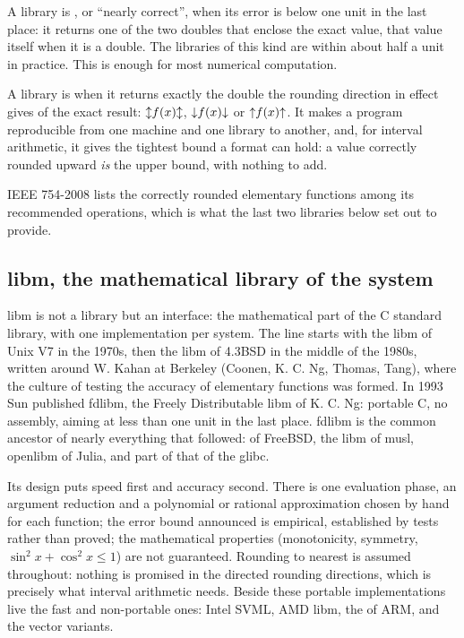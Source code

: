 \begin{Def}\label{def:faithful}
A library is , or ``nearly correct'', when its
error is below one unit in the last place: it returns one of the two doubles
that enclose the exact value, that value itself when it is a double. The libraries of this kind are within about half a
unit in practice. This is enough for most numerical computation.
\end{Def}

\begin{Def}\label{def:correct-rounding}
A library is  when it returns exactly the double the
rounding direction in effect gives of the exact result:
$\mathopen{\updownarrow}f(x)\mathclose{\updownarrow}$, $\mathopen{\downarrow}f(x)\mathclose{\downarrow}$ or $\mathopen{\uparrow}f(x)\mathclose{\uparrow}$. It makes a
program reproducible from one machine and one library to another, and, for
interval arithmetic, it gives the tightest bound a format can hold: a value
correctly rounded upward \emph{is} the upper bound, with nothing to add.
\end{Def}

\noindent IEEE 754-2008 lists the correctly rounded elementary functions
among its recommended operations, which is what the last two libraries
below set out to provide.

\subsection{libm, the mathematical library of the system}

libm is not a library but an interface: the mathematical part of the C
standard library, with one implementation per system. The line starts with
the libm of Unix V7 in the 1970s, then the libm of 4.3BSD in the middle of
the 1980s, written around W. Kahan at Berkeley (Coonen, K. C. Ng, Thomas,
Tang), where the culture of testing the accuracy of elementary functions
was formed. In 1993 Sun published fdlibm, the Freely Distributable libm of
K. C. Ng: portable C, no assembly, aiming at less than one unit in the last
place. fdlibm is the common ancestor of nearly everything that followed:
 of FreeBSD, the libm of musl, openlibm of Julia, and part of
that of the glibc.

\medskip
Its design puts speed first and accuracy second. There is one evaluation
phase, an argument reduction and a polynomial or rational approximation
chosen by hand for each function; the error bound announced is empirical,
established by tests rather than proved; the mathematical properties
(monotonicity, symmetry, $\sin^2x+\cos^2x\leq1$) are not guaranteed.
Rounding to nearest is assumed throughout: nothing is promised in the
directed rounding directions, which is precisely what interval arithmetic
needs. Beside these portable implementations live the fast and
non-portable ones: Intel SVML, AMD libm, the  of
ARM, and the vector variants.

